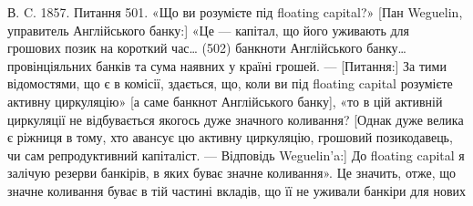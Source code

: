 В. C. 1857. Питання 501. «Що ви розумієте під floating capital?» [Пан
Weguelin, управитель Англійського банку:] «Це — капітал, що його уживають
для грошових позик на короткий час\dots{} (502) банкноти Англійського банку\dots{}
провінціяльних банків та сума наявних у країні грошей. — [Питання:] За тими
відомостями, що є в комісії, здається, що, коли ви під floating capital розумієте
активну циркуляцію» [а саме банкнот Англійського банку], «то в цій активній
циркуляції не відбувається якогось дуже значного коливання? [Однак дуже велика
є ріжниця в тому, хто авансує цю активну циркуляцію, грошовий позикодавець,
чи сам репродуктивний капіталіст. — Відповідь Weguelin’a:] До floating capital я
залічую резерви банкірів, в яких буває значне коливання». Це значить, отже, що
значне коливання буває в тій частині вкладів, що її не уживали банкіри для нових
\parbreak{}  %
